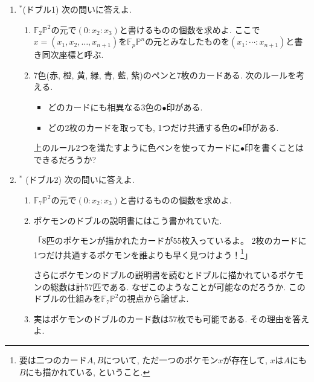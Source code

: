 \documentclass[dvipdfmx,a4paper,11pt]{article}
\theoremstyle{definition}
\begin{document}
\begin{enumerate}[label=\textbf{問}\ref*{sec-6}.\arabic*]
\item $^*$(ドブル1)
次の問いに答えよ.
    \begin{enumerate}[label=(\arabic*).]
 \setlength{\parskip}{0cm}
  \setlength{\itemsep}{0pt}
  \item $\mathbb{F}_{2}\mathbb{P}^2$の元で$(0: x_2 : x_3)$と書けるものの個数を求めよ. ここで$x= (x_{1}, x_{2}, \ldots, x_{n+1})$を$\mathbb{F}_{p}\mathbb{P}^n$の元とみなしたものを$(x_{1}: \cdots : x_{n+1})$と書き同次座標と呼ぶ.
  \item 7色(赤, 橙, 黄, 緑, 青, 藍, 紫)のペンと7枚のカードある. 
 次のルールを考える. 
 \begin{itemize}
 \setlength{\parskip}{0cm}
  \setlength{\itemsep}{0pt}
  \item どのカードにも相異なる3色の$\bullet$印がある.
  \item どの2枚のカードを取っても, 1つだけ共通する色の$\bullet$印がある.
\end{itemize}
上のルール2つを満たすように色ペンを使ってカードに$\bullet$印を書くことはできるだろうか?
  \end{enumerate}
\item $^*$ (ドブル2)
次の問いに答えよ.
    \begin{enumerate}[label=(\arabic*).]
 \setlength{\parskip}{0cm}
  \setlength{\itemsep}{0pt}
  \item $\mathbb{F}_{7}\mathbb{P}^2$の元で$(0: x_2 : x_3)$と書けるものの個数を求めよ. 
  \item ポケモンのドブルの説明書にはこう書かれていた.  
  
   「8匹のポケモンが描かれたカードが55枚入っているよ。 2枚のカードに1つだけ共通するポケモンを誰よりも早く見つけよう！\footnote{要は二つのカード$A, B$について, ただ一つのポケモン$x$が存在して, $x$は$A$にも$B$にも描かれている, ということ.}」  
 
  さらにポケモンのドブルの説明書を読むとドブルに描かれているポケモンの総数は計57匹である. なぜこのようなことが可能なのだろうか. このドブルの仕組みを$\mathbb{F}_{7}\mathbb{P}^2$の視点から論ぜよ. 
  \item 実はポケモンのドブルのカード数は57枚でも可能である. その理由を答えよ. 
  \end{enumerate}
  
 \end{enumerate}
\end{document}
